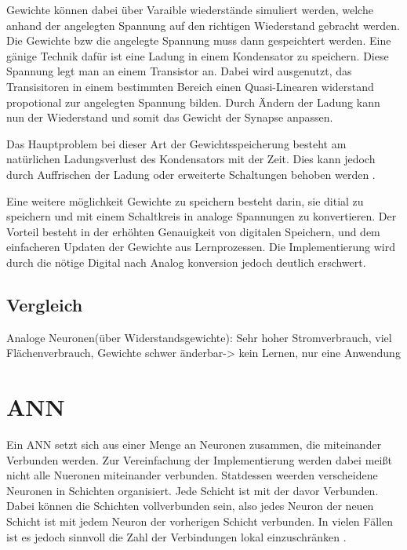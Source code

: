 \documentclass[conference]{IEEEtran}
\begin{document}
    Gewichte können dabei über Varaible wiederstände simuliert werden, welche anhand der angelegten Spannung auf den richtigen Wiederstand gebracht werden.
    Die Gewichte bzw die angelegte Spannung muss dann gespeichtert werden.
    Eine gänige Technik dafür ist eine Ladung in einem Kondensator zu speichern.
    Diese Spannung legt man an einem Transistor an.
    Dabei wird ausgenutzt, das Transisitoren in einem bestimmten Bereich einen Quasi-Linearen widerstand propotional zur angelegten Spannung bilden.
    Durch Ändern der Ladung kann nun der Wiederstand und somit das Gewicht der Synapse anpassen.

    Das Hauptproblem bei dieser Art der Gewichtsspeicherung besteht am natürlichen Ladungsverlust des Kondensators mit der Zeit.
    Dies kann jedoch durch Auffrischen der Ladung oder erweiterte Schaltungen behoben werden \cite{reed1989multiple} .


    Eine weitere möglichkeit Gewichte zu speichern besteht darin, sie ditial zu speichern und mit einem Schaltkreis in analoge Spannungen zu konvertieren.
    Der Vorteil besteht in der erhöhten Genauigkeit von digitalen Speichern, und dem einfacheren Updaten der Gewichte aus Lernprozessen.
    Die Implementierung wird durch die nötige Digital nach Analog konversion jedoch deutlich erschwert.



    \subsection{Vergleich}

    Analoge Neuronen(über Widerstandsgewichte): Sehr hoher Stromverbrauch, viel Flächenverbrauch, Gewichte schwer änderbar-> kein Lernen, nur eine Anwendung

    \section{ANN}


    Ein ANN setzt sich aus einer Menge an Neuronen zusammen, die miteinander Verbunden werden.
    Zur Vereinfachung der Implementierung werden dabei meißt nicht alle Nueronen miteinander verbunden.
    Statdessen weerden verscheidene Neuronen in Schichten organisiert.
    Jede Schicht ist mit der davor Verbunden.
    Dabei können die Schichten vollverbunden sein, also jedes Neuron der neuen Schicht ist mit jedem Neuron der vorherigen Schicht verbunden.
    In vielen Fällen ist es jedoch sinnvoll die Zahl der Verbindungen lokal einzuschränken \cite{boser1991analog} .
\end{document}
